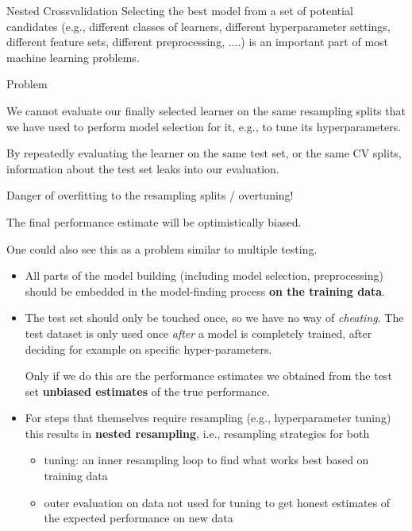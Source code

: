 \begin{frame}{Nested Crossvalidation}
Selecting the best model from a set of potential candidates (e.g., different classes of learners, different hyperparameter settings, different feature sets, different preprocessing, ....) is an important part of most  machine learning problems.

\begin{blocki}{Problem}
    \item We cannot evaluate our finally selected learner on the same resampling splits that we have used to perform model selection for it, e.g., to tune its hyperparameters.
    \item By repeatedly evaluating the learner on the same test set, or the same CV splits, information
      about the test set leaks into our evaluation.
    \item Danger of overfitting to the resampling splits / overtuning!
    \item The final performance estimate will be optimistically biased.
    \item One could also see this as a problem similar to multiple testing.
\end{blocki}

\framebreak

\begin{itemize}
\item All parts of the model building (including model selection, preprocessing) should be embedded in the model-finding process \textbf{on the training data}.
\item The test set should only be touched once, so we have no way of \textit{cheating}. The test dataset is only used once \emph{after} a model is completely trained, after deciding for example on specific hyper-parameters.

Only if we do this are the performance estimates we obtained from the test set  \textbf{unbiased estimates} of the true performance.

\item For steps that themselves require resampling (e.g., hyperparameter tuning) this results
  in \textbf{nested resampling}, i.e., resampling strategies for both
  \begin{itemize}
  \item tuning: an inner resampling loop to find what works best based on training data
  \item outer evaluation on data not used for tuning to get honest estimates of the expected performance on new data
  \end{itemize}
\end{itemize}


\end{frame}
